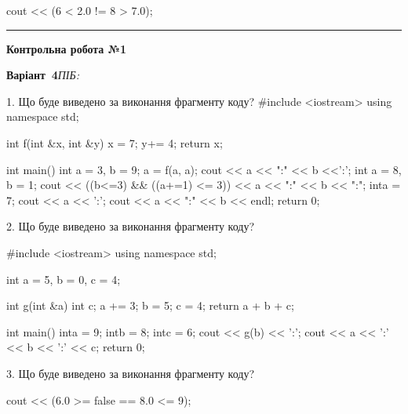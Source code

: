 \documentclass[11pt]{article}
\begin{document}
cout << (6 < 2.0 != 8 > 7.0);




\vspace{10mm}
\noindent\textcolor{gray}{\rule{\textwidth}{0.3pt}}
\vspace{8mm}
{\large\textbf{Контрольна робота №1}}

\textbf{Варіант \No\,4}\hfill \textit{ПІБ:}\,\underline{\hspace{60mm}}
\vspace{4mm}

1. Що буде виведено за виконання фрагменту коду?
#include <iostream>
using namespace std;

int f(int &x, int &y){
    x = 7;
    y+= 4;
    return x;
}

int main(){
    int a = 3, b = 9;
    a = f(a, a);
    cout << a << ":" << b <<':';
    {
        int a = 8, b = 1;
        cout << ((b<=3) && ((a+=1) <= 3))
             << a << ":" << b << ":";
    }
    {
        inta = 7;
        cout << a << ':';
    }
    cout << a << ":" << b << endl;
    return 0;
}


2. Що буде виведено за виконання фрагменту коду?

#include <iostream>
using namespace std;

int a = 5, b = 0, c = 4;

int g(int &a){
int c;    a += 3;
    b = 5;
    c = 4;
    return a + b + c;
}

int main(){
    inta = 9;
    intb = 8;
    intc = 6;
    cout << g(b) << ':';
    cout << a << ':' << b << ':' << c;
    return 0; 
}

3. Що буде виведено за виконання фрагменту коду?

cout << (6.0 >= false == 8.0 <= 9);




\newpage
\end{document}
